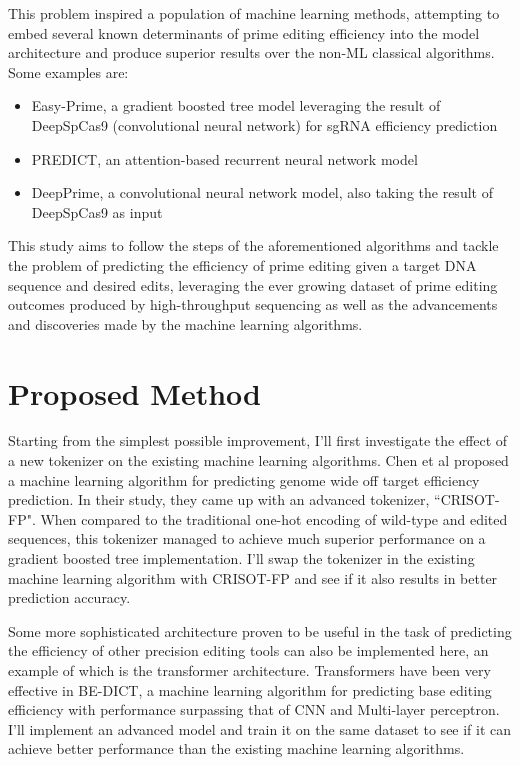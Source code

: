 \documentclass[12pt]{article}
\begin{document}
This problem inspired a population of machine learning methods, attempting to embed several known determinants of prime editing efficiency into the model architecture and produce superior results over the non-ML classical algorithms. Some examples are:

\begin{itemize}
    \item Easy-Prime, a gradient boosted tree model leveraging the result of DeepSpCas9 (convolutional neural network) for sgRNA efficiency prediction\cite{liEasyPrimeMachineLearning2021,kimSpCas9ActivityPrediction2019}
    \item PREDICT, an attention-based recurrent neural network model\cite{schwankgeraldPredictingPrimeEditing2023}
    \item DeepPrime, a convolutional neural network model, also taking the result of DeepSpCas9 as input\cite{kimPredictingEfficiencyPrime2021a}
\end{itemize}


This study aims to follow the steps of the aforementioned algorithms and tackle the problem of predicting the efficiency of prime editing given a target DNA sequence and desired edits, leveraging the ever growing dataset of prime editing outcomes produced by high-throughput sequencing as well as the advancements and discoveries made by the machine learning algorithms.

\section{Proposed Method}

Starting from the simplest possible improvement, I'll first investigate the effect of a new tokenizer on the existing machine learning algorithms. Chen et al proposed a machine learning algorithm for predicting genome wide off target efficiency prediction. In their study, they came up with an advanced tokenizer, ``CRISOT-FP". When compared to the traditional one-hot encoding of wild-type and edited sequences, this tokenizer managed to achieve much superior performance on a gradient boosted tree implementation\cite{chenGenomewideCRISPROfftarget2023}. I'll swap the tokenizer in the existing machine learning algorithm with CRISOT-FP and see if it also results in better prediction accuracy.

Some more sophisticated architecture proven to be useful in the task of predicting the efficiency of other precision editing tools can also be implemented here, an example of which is the transformer architecture. Transformers have been very effective in BE-DICT, a machine learning algorithm for predicting base editing efficiency with performance surpassing that of CNN and Multi-layer perceptron\cite{marquartPredictingBaseEditing2021}. I'll implement an advanced model and train it on the same dataset to see if it can achieve better performance than the existing machine learning algorithms.
\end{document}
